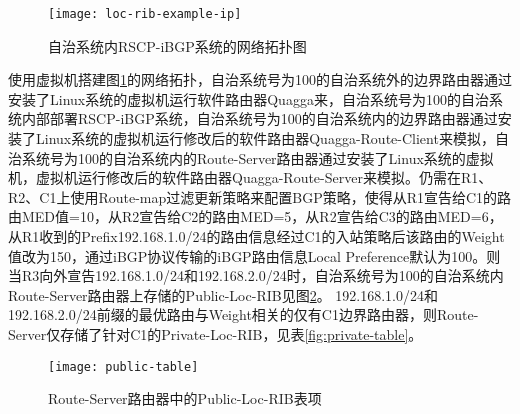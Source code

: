 \begin{figure}
  \centering
  \texttt{[image: loc-rib-example-ip]}
  \caption{自治系统内RSCP-iBGP系统的网络拓扑图}
  \label{fig:loc-rib-example-ip}
\end{figure}


使用虚拟机搭建图\ref{fig:loc-rib-example-ip}的网络拓扑，自治系统号为100的自治系统外的边界路由器通过安装了Linux系统的虚拟机运行软件路由器Quagga来，自治系统号为100的自治系统内部部署RSCP-iBGP系统，自治系统号为100的自治系统内的边界路由器通过安装了Linux系统的虚拟机运行修改后的软件路由器Quagga-Route-Client来模拟，自治系统号为100的自治系统内的Route-Server路由器通过安装了Linux系统的虚拟机，虚拟机运行修改后的软件路由器Quagga-Route-Server来模拟。仍需在R1、R2、C1上使用Route-map过滤更新策略来配置BGP策略，使得从R1宣告给C1的路由MED值=10，从R2宣告给C2的路由MED=5，从R2宣告给C3的路由MED=6，从R1收到的Prefix192.168.1.0/24的路由信息经过C1的入站策略后该路由的Weight值改为150，通过iBGP协议传输的iBGP路由信息Local Preference默认为100。则当R3向外宣告192.168.1.0/24和192.168.2.0/24时，自治系统号为100的自治系统内Route-Server路由器上存储的Public-Loc-RIB见图\ref{fig:public-table}。 192.168.1.0/24和192.168.2.0/24前缀的最优路由与Weight相关的仅有C1边界路由器，则Route-Server仅存储了针对C1的Private-Loc-RIB，见表\ref{fig:private-table}。


\begin{figure}
  \centering
  \texttt{[image: public-table]}
  \caption{Route-Server路由器中的Public-Loc-RIB表项}
  \label{fig:public-table}
\end{figure}

